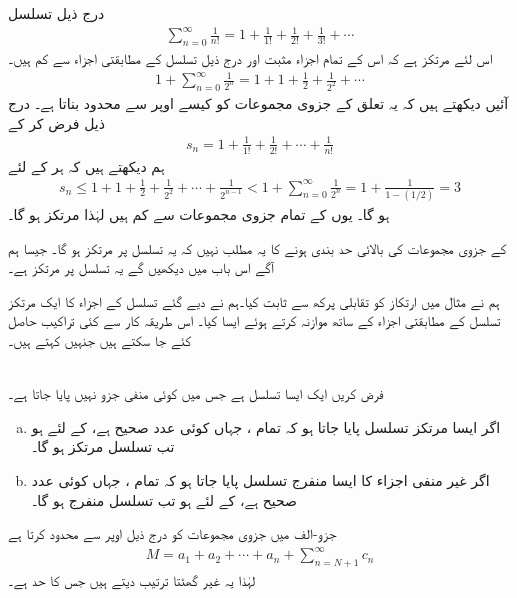 درج ذیل تسلسل
\begin{align*}
\sum\limits_{n=0}^{\infty}\frac{1}{n!}=1+\frac{1}{1!}+\frac{1}{2!}+\frac{1}{3!}+\cdots
\end{align*}
 اس لئے مرتکز ہے کہ اس کے تمام اجزاء مثبت اور  درج ذیل تسلسل کے مطابقتی اجزاء سے کم ہیں۔
\begin{align*}
1+\sum_{n=0}^{\infty}\frac{1}{2^n}=1+1+\frac{1}{2}+\frac{1}{2^2}+\cdots
\end{align*}
آئیں دیکھتے ہیں کہ یہ تعلق   کے جزوی مجموعات کو کیسے اوپر سے محدود بناتا ہے۔ درج ذیل فرض کر کے
\begin{align*}
s_n=1+\frac{1}{1!}+\frac{1}{2!}+\cdots+\frac{1}{n!}
\end{align*}
ہم دیکھتے ہیں کہ ہر  کے لئے
\begin{align*}
s_n\le 1+1+\frac{1}{2}+\frac{1}{2^2}+\cdots+\frac{1}{2^{n-1}}<1+\sum_{n=0}^{\infty}\frac{1}{2^n}=1+\frac{1}{1-(1/2)}=3
\end{align*}
ہو گا۔ یوں  کے تمام جزوی مجموعات  سے کم ہیں لہٰذا  مرتکز ہو گا۔

 کے جزوی مجموعات کی بالائی حد بندی  ہونے کا یہ مطلب نہیں کہ یہ تسلسل  پر مرتکز ہو گا۔ جیسا ہم آگے اس باب میں دیکھیں گے یہ تسلسل  پر مرتکز ہے۔ 

ہم نے مثال  میں ارتکاز کو تقابلی پرکھ سے ثابت کیا۔ہم نے دیے گئے تسلسل کے اجزاء کا ایک مرتکز تسلسل کے مطابقتی اجزاء کے ساتھ موازنہ کرتے ہوئے ایسا کیا۔ اس طریقہ کار سے کئی تراکیب حاصل کئے جا سکتے ہیں جنہیں  کہتے ہیں۔

\\
فرض کریں  ایک ایسا تسلسل ہے جس میں کوئی منفی جزو نہیں پایا جاتا ہے۔
\begin{enumerate}[a.]
\item
اگر ایسا مرتکز تسلسل  پایا جاتا ہو کہ  تمام ، جہاں  کوئی عدد صحیح ہے،  کے لئے  ہو تب تسلسل  مرتکز ہو گا۔
\item
اگر غیر منفی اجزاء کا ایسا منفرج تسلسل  پایا جاتا ہو کہ  تمام ، جہاں  کوئی عدد صحیح ہے،  کے لئے  ہو تب  تسلسل  منفرج ہو گا۔
\end{enumerate}
جزو-الف میں جزوی مجموعات  کو درج ذیل اوپر سے محدود کرتا ہے
\begin{align*}
M=a_1+a_2+\cdots+a_n+\sum_{n=N+1}^{\infty}c_n
\end{align*}
لہٰذا یہ غیر گھٹتا ترتیب دیتے ہیں جس کا حد  ہے۔

